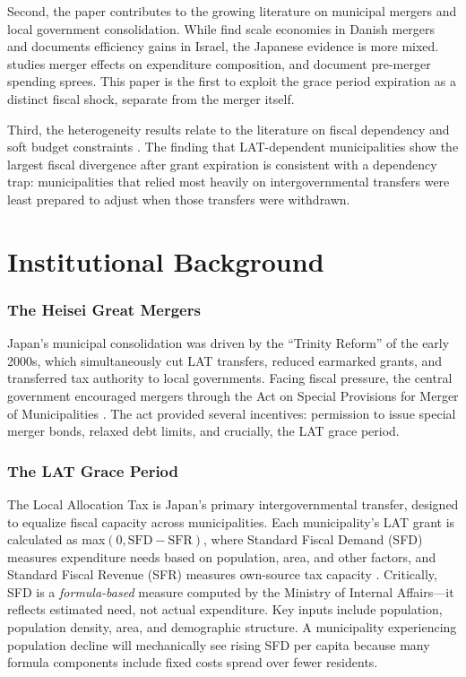 \documentclass[12pt]{article}
\begin{document}
Second, the paper contributes to the growing literature on municipal mergers and local government consolidation. While \citet{blom2016} find scale economies in Danish mergers and \citet{reingewertz2012} documents efficiency gains in Israel, the Japanese evidence is more mixed. \citet{miyazaki2018} studies merger effects on expenditure composition, and \citet{akai2022} document pre-merger spending sprees. This paper is the first to exploit the grace period expiration as a distinct fiscal shock, separate from the merger itself.

Third, the heterogeneity results relate to the literature on fiscal dependency and soft budget constraints \citep{kornai1986}. The finding that LAT-dependent municipalities show the largest fiscal divergence after grant expiration is consistent with a dependency trap: municipalities that relied most heavily on intergovernmental transfers were least prepared to adjust when those transfers were withdrawn.

\section{Institutional Background}

\subsubsection*{The Heisei Great Mergers} Japan's municipal consolidation was driven by the ``Trinity Reform'' of the early 2000s, which simultaneously cut LAT transfers, reduced earmarked grants, and transferred tax authority to local governments. Facing fiscal pressure, the central government encouraged mergers through the Act on Special Provisions for Merger of Municipalities \citep{yokomichi2007}. The act provided several incentives: permission to issue special merger bonds, relaxed debt limits, and crucially, the LAT grace period.

\subsubsection*{The LAT Grace Period} The Local Allocation Tax is Japan's primary intergovernmental transfer, designed to equalize fiscal capacity across municipalities. Each municipality's LAT grant is calculated as max$(0, \text{SFD} - \text{SFR})$, where Standard Fiscal Demand (SFD) measures expenditure needs based on population, area, and other factors, and Standard Fiscal Revenue (SFR) measures own-source tax capacity \citep{mochida2008}. Critically, SFD is a \emph{formula-based} measure computed by the Ministry of Internal Affairs---it reflects estimated need, not actual expenditure. Key inputs include population, population density, area, and demographic structure. A municipality experiencing population decline will mechanically see rising SFD per capita because many formula components include fixed costs spread over fewer residents.
\end{document}
